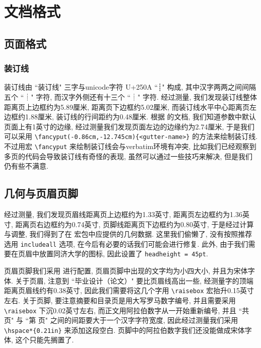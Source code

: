 
\section{文档格式}

\subsection{页面格式}

\subsubsection{装订线}

装订线由 ``装订线" 三字与unicode字符 U+250A ``┊" 构成, 其中汉字两两之间间隔五个 ``┊" 字符, 而汉字外侧还有十三个 ``┊" 字符. 经过测量, 我们发现装订线整体距离页上边框约为5.89厘米, 距离页下边框约5.02厘米, 而装订线水平中心距离页左边框约1.88厘米, 装订线的行间距约为0.48厘米. 根据  的文档, 我们知道参数中默认页面上有1英寸的边缘, 经过测量我们发现页面左边的边缘约为2.74厘米, 于是我们可以采用 \verb|\fancyput(-0.86cm,-12.745cm){<gutter-name>}| 的方法来绘制装订线. 不过用宏 \verb|\fancyput| 来绘制装订线会与verbatim环境有冲突, 比如我们已经观察到多页的代码会导致装订线有奇怪的表现, 虽然可以通过一些技巧来解决, 但是我们仍有些不满意.

\subsection{几何与页眉页脚}

经过测量, 我们发现页眉线距离页上边框约为1.33英寸, 距离页左边框约为1.36英寸, 距离页右边框约为0.74英寸, 页脚线距离页下边框约为0.80英寸, 于是经过计算与调整, 我们得到了在  宏包中应提供的几何数据. 这里我们偷懒了, 没有按照推荐选用 \verb|includeall| 选项, 在今后有必要的话我们可能会进行修复. 此外, 由于我们需要在页眉中放置同济大学的图标, 因此设置了 \verb|headheight = 45pt|.

页眉页脚我们采用  进行配置, 页眉页脚中出现的文字均为小四大小, 并且为宋体字体. 关于页眉, 注意到 ``毕业设计（论文）" 要比页眉线高出一些, 经测量字的顶端距离页眉线约有0.38英寸, 因此我们需要将这几个字用 \verb|\raisebox| 宏抬升0.15英寸左右. 关于页脚, 要注意摘要和目录页是用大写罗马数字编号, 并且需要采用 \verb|\raisebox| 下沉0.02英寸左右, 而正文用阿拉伯数字从一开始重新编号, 并且 ``共 页" 与 ``第 页" 之间的间距要大于一个汉字字符宽度, 因此经过测量我们采用 \verb|\hspace*{0.21in}| 来添加这段空白. 页脚中的阿拉伯数字我们还没能做成宋体字体, 这个只能先搁置了.


